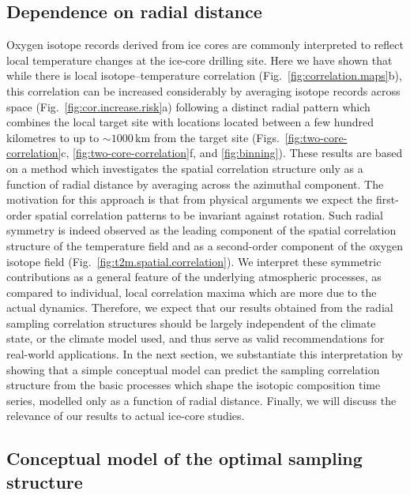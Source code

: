 \documentclass[cp, manuscript]{copernicus}
\begin{document}
\subsection{Dependence on radial distance}
\label{discussion:radial.dependence}

Oxygen isotope records derived from ice cores are commonly interpreted to
reflect local temperature changes at the ice-core drilling site. Here we have
shown that while there is local isotope--temperature correlation
(Fig.~\ref{fig:correlation.maps}b), this correlation can be increased
considerably by averaging isotope records across space
(Fig.~\ref{fig:cor.increase.risk}a) following a distinct radial pattern which
combines the local target site with locations located between a few hundred
kilometres to up to $\sim1000$\,km from the target site
(Figs.~\ref{fig:two-core-correlation}c, \ref{fig:two-core-correlation}f, and
\ref{fig:binning}). These results are based on a method which investigates the
spatial correlation structure only as a function of radial distance by averaging
across the azimuthal component. The motivation for this approach is that from
physical arguments we expect the first-order spatial correlation patterns to be
invariant against rotation. Such radial symmetry is indeed observed as the
leading component of the spatial correlation structure of the temperature field
and as a second-order component of the oxygen isotope field
(Fig.~\ref{fig:t2m.spatial.correlation}). We interpret these symmetric
contributions as a general feature of the underlying atmospheric processes, as
compared to individual, local correlation maxima which are more due to the
actual dynamics. Therefore, we expect that our results obtained from the radial
sampling correlation structures should be largely independent of the climate
state, or the climate model used, and thus serve as valid recommendations for
real-world applications. In the next section, we substantiate this
interpretation by showing that a simple conceptual model can predict the
sampling correlation structure from the basic processes which shape the isotopic
composition time series, modelled only as a function of radial distance.
Finally, we will discuss the relevance of our results to actual ice-core
studies.

\subsection{Conceptual model of the optimal sampling structure}
\label{discussion:concept.model}
\end{document}
